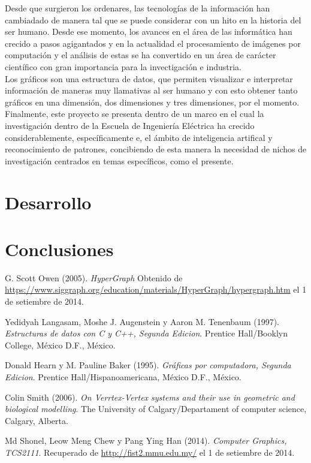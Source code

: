 \documentclass[11pt,letterpaper]{article}     %
\begin{document}
Desde que surgieron los ordenares, las tecnolog\' ias de la informaci\' on han cambiadado de manera tal que se puede considerar con un hito en la historia del ser humano. Desde ese momento, los avances en el \' area de las inform\' atica han crecido a pasos agigantados y en la actualidad el procesamiento de im\' agenes por computaci\' on y el an\' alisis de estas se ha convertido en un \' area de car\' acter cient\' ifico con gran importancia para la invectigaci\' on e industria.\\
Los gr\' aficos son una estructura de datos, que permiten visualizar e interpretar informaci\' on de maneras muy llamativas al ser humano y con esto obtener tanto gr\' aficos en una dimensi\' on, dos dimensiones y tres dimensiones, por el momento.\\
Finalmente, este proyecto se presenta dentro de un marco en el cual la investigaci\' on dentro de la Escuela de Ingenier\' ia El\' ectrica ha crecido considerablemente, espec\' ificamente e, el \' ambito de inteligencia artifical y reconocimiento de patrones, concibiendo de esta manera la necesidad de nichos de investigaci\' on centrados en temas espec\' ificos, como el presente.


\section{Desarrollo}

\section{Conclusiones}


\renewcommand{\bibname}{Referencias}

\begin{thebibliography}{5}
 G. Scott Owen (2005). \textit{HyperGraph} Obtenido de \url{https://www.siggraph.org/education/materials/HyperGraph/hypergraph.htm}  el 1 de setiembre de 2014.

 Yedidyah Langasam, Moshe J. Augenstein y Aaron M. Tenenbaum (1997). \textit{Estructuras de datos con C y C++, Segunda Edicion}. Prentice Hall/Booklyn College, México D.F., México.

 Donald Hearn y M. Pauline Baker (1995). \textit{Gr\' aficas por computadora, Segunda Edicion}. Prentice Hall/Hispanoamericana, México D.F., México.

 Colin Smith (2006). \textit{On Verrtex-Vertex systems and their use in geometric and biological modelling}. The University of Calgary/Departament of computer science, Calgary, Alberta.

 Md Shonel, Leow Meng Chew y Pang Ying Han (2014). \textit{Computer Graphics, TCS2111}. Recuperado de \url{http://fist2.mmu.edu.my/} el 1 de setiembre de 2014.

\end{thebibliography} 
\end{document}
